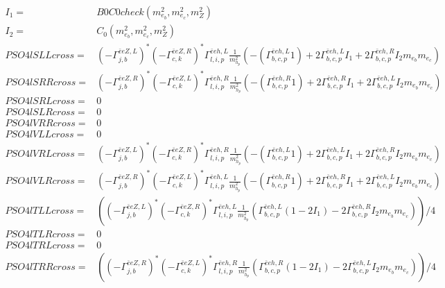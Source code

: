 \documentclass[A4,landscape]{article}
\begin{document}
\begin{align} 
I_1= & B0C0check(m^2_{e_{{b}}}, m^2_{e_{{c}}}, m^2_{Z}) \\ 
I_2= & C_0(m^2_{e_{{b}}}, m^2_{e_{{c}}}, m^2_{Z}) \\ 
  PSO4lSLLcross= &  (- \Gamma^{\bar{e}e Z ,L} _{j, b})^* (- \Gamma^{\bar{e}e Z ,R} _{c, k})^* \Gamma^{\bar{e}e h ,L}_{l, i, p} \frac{1}{m^2_{h_{{p}}}} (-(\Gamma^{\bar{e}e h ,L}_{b, c, p} 1) + 2 \Gamma^{\bar{e}e h ,L}_{b, c, p} I_1 + 2 \Gamma^{\bar{e}e h ,R}_{b, c, p} I_2 m_{e_{{b}}} m_{e_{{c}}}) \\ 
  PSO4lSRRcross= &  (- \Gamma^{\bar{e}e Z ,R} _{j, b})^* (- \Gamma^{\bar{e}e Z ,L} _{c, k})^* \Gamma^{\bar{e}e h ,R}_{l, i, p} \frac{1}{m^2_{h_{{p}}}} (-(\Gamma^{\bar{e}e h ,R}_{b, c, p} 1) + 2 \Gamma^{\bar{e}e h ,R}_{b, c, p} I_1 + 2 \Gamma^{\bar{e}e h ,L}_{b, c, p} I_2 m_{e_{{b}}} m_{e_{{c}}}) \\ 
  PSO4lSRLcross= & 0 \\ 
  PSO4lSLRcross= & 0 \\ 
  PSO4lVRRcross= & 0 \\ 
  PSO4lVLLcross= & 0 \\ 
  PSO4lVRLcross= &  (- \Gamma^{\bar{e}e Z ,L} _{j, b})^* (- \Gamma^{\bar{e}e Z ,R} _{c, k})^* \Gamma^{\bar{e}e h ,R}_{l, i, p} \frac{1}{m^2_{h_{{p}}}} (-(\Gamma^{\bar{e}e h ,L}_{b, c, p} 1) + 2 \Gamma^{\bar{e}e h ,L}_{b, c, p} I_1 + 2 \Gamma^{\bar{e}e h ,R}_{b, c, p} I_2 m_{e_{{b}}} m_{e_{{c}}}) \\ 
  PSO4lVLRcross= &  (- \Gamma^{\bar{e}e Z ,R} _{j, b})^* (- \Gamma^{\bar{e}e Z ,L} _{c, k})^* \Gamma^{\bar{e}e h ,L}_{l, i, p} \frac{1}{m^2_{h_{{p}}}} (-(\Gamma^{\bar{e}e h ,R}_{b, c, p} 1) + 2 \Gamma^{\bar{e}e h ,R}_{b, c, p} I_1 + 2 \Gamma^{\bar{e}e h ,L}_{b, c, p} I_2 m_{e_{{b}}} m_{e_{{c}}}) \\ 
  PSO4lTLLcross= & ( (- \Gamma^{\bar{e}e Z ,L} _{j, b})^* (- \Gamma^{\bar{e}e Z ,R} _{c, k})^* \Gamma^{\bar{e}e h ,L}_{l, i, p} \frac{1}{m^2_{h_{{p}}}} (\Gamma^{\bar{e}e h ,L}_{b, c, p} (1 - 2 I_1) - 2 \Gamma^{\bar{e}e h ,R}_{b, c, p} I_2 m_{e_{{b}}} m_{e_{{c}}}))/4 \\ 
  PSO4lTLRcross= & 0 \\ 
  PSO4lTRLcross= & 0 \\ 
  PSO4lTRRcross= & ( (- \Gamma^{\bar{e}e Z ,R} _{j, b})^* (- \Gamma^{\bar{e}e Z ,L} _{c, k})^* \Gamma^{\bar{e}e h ,R}_{l, i, p} \frac{1}{m^2_{h_{{p}}}} (\Gamma^{\bar{e}e h ,R}_{b, c, p} (1 - 2 I_1) - 2 \Gamma^{\bar{e}e h ,L}_{b, c, p} I_2 m_{e_{{b}}} m_{e_{{c}}}))/4 \\ 
\end{align} 
\end{document}
